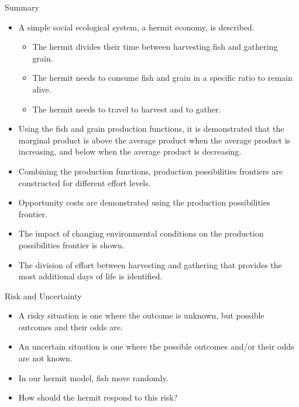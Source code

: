 \begin{frame}{Summary}
	\begin{itemize}
		\item A simple social ecological system, a hermit economy, is described.
		\begin{itemize}
			\item The hermit divides their time between harvesting fish and gathering grain.
			\item The hermit needs to consume fish and grain in a specific ratio to remain alive.
			\item The hermit needs to travel to harvest and to gather.
		\end{itemize}
		\item Using the fish and grain production functions, it is demonstrated that the marginal product is above the average product when the average product is increasing, and below when the average product is decreasing.
		\item Combining the production functions, production possibilities frontiers are constructed for different effort levels.
		\item Opportunity costs are demonstrated using the production possibilities frontier.
		\item The impact of changing environmental conditions on the production possibilities frontier is shown.
		\item The division of effort between harvesting and gathering that provides the most additional days of life is identified.
	\end{itemize}
\end{frame}


\begin{frame}{Risk and Uncertainty}
	\begin{itemize}
		\item A risky situation is one where the outcome is unknown, but possible outcomes and their odds are.
		\item An uncertain situation is one where the possible outcomes and/or their odds are not known.\vspace{10pt}
		\item In our hermit model, fish move randomly.  
		\item How should the hermit respond to this risk?
	\end{itemize}
\end{frame}

